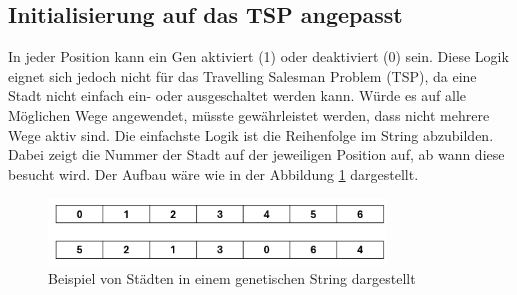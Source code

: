 \subsection{Initialisierung auf das TSP angepasst
\label{buch:paper:varalg:subsection:initialization_tsp}}
In jeder Position kann ein Gen aktiviert (1) oder deaktiviert (0) sein.
Diese Logik eignet sich jedoch nicht für das Travelling Salesman 
Problem (TSP), da eine Stadt nicht einfach ein- oder ausgeschaltet werden kann.
Würde es auf alle Möglichen Wege angewendet, müsste gewährleistet werden, 
dass nicht mehrere Wege aktiv sind. Die einfachste Logik ist die Reihenfolge  
im String abzubilden. Dabei zeigt die Nummer der Stadt auf der jeweiligen Position
auf, ab wann diese besucht wird. Der Aufbau wäre wie in der 
Abbildung \ref{fig:cities_genetic_string} dargestellt.
\begin{figure}
	\centering
	\includegraphics[width=0.8\textwidth]{
        papers/varalg/images/teil3/02GeneticStringCities.png
        }
	\caption{Beispiel von Städten in einem genetischen String dargestellt}
	\label{fig:cities_genetic_string}
\end{figure}

